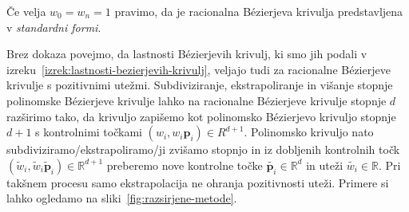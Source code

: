 \documentclass[isrm2, tisk]{fmfdelo}
\newcommand{\R}{\mathbb R}
\newcommand{\p}{\mathbf{p}}
\begin{document}
    \begin{opomba}
        Če velja $w_0=w_n=1$ pravimo, da je racionalna Bézierjeva krivulja predstavljena v \textit{standardni formi}.
    \end{opomba}
    Brez dokaza povejmo, da lastnosti Bézierjevih krivulj, ki smo jih podali v izreku~\ref{izrek:lastnosti-bezierjevih-krivulj}, veljajo tudi za racionalne Bézierjeve krivulje s pozitivnimi utežmi.
    Subdiviziranje, ekstrapoliranje in višanje stopnje polinomske Bézierjeve krivulje lahko na racionalne Bézierjeve krivulje stopnje $d$ razširimo tako, da krivuljo zapišemo kot polinomsko Bézierjevo krivuljo stopnje $d+1$ s kontrolnimi točkami  $(w_i,w_{i}\p_i)\in R^{d+1}$.
    Polinomsko krivuljo nato subdiviziramo/ekstrapoliramo/ji zvišamo stopnjo in iz dobljenih kontrolnih točk $(\tilde{w}_i,\tilde{w}_{i}\tilde{\p}_i)\in\R^{d+1}$ preberemo nove kontrolne točke $\tilde{\p_i}\in\R^d$ in uteži $\tilde{w_i}\in\R$.
    Pri takšnem procesu samo ekstrapolacija ne ohranja pozitivnosti uteži.
    Primere si lahko ogledamo na sliki~\ref{fig:razsirjene-metode}.
\end{document}
